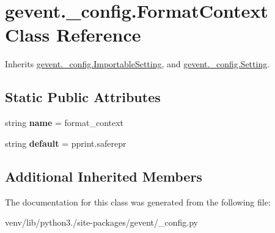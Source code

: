 \hypertarget{classgevent_1_1__config_1_1_format_context}{}\section{gevent.\+\_\+config.\+Format\+Context Class Reference}
\label{classgevent_1_1__config_1_1_format_context}


Inherits \hyperlink{classgevent_1_1__config_1_1_importable_setting}{gevent.\+\_\+config.\+Importable\+Setting}, and \hyperlink{classgevent_1_1__config_1_1_setting}{gevent.\+\_\+config.\+Setting}.

\subsection*{Static Public Attributes}
\begin{DoxyCompactItemize}
\item 
\mbox{\label{classgevent_1_1__config_1_1_format_context_aca90b8d54c2aca4d739331dd82618833}} 
string {\bfseries name} = \textquotesingle{}format\+\_\+context\textquotesingle{}
\item 
\mbox{\label{classgevent_1_1__config_1_1_format_context_aa50bd805614010ab835488d3c3a8d494}} 
string {\bfseries default} = \textquotesingle{}pprint.\+saferepr\textquotesingle{}
\end{DoxyCompactItemize}
\subsection*{Additional Inherited Members}


The documentation for this class was generated from the following file\+:\begin{DoxyCompactItemize}
\item 
venv/lib/python3./site-\/packages/gevent/\+\_\+config.\+py\end{DoxyCompactItemize}
